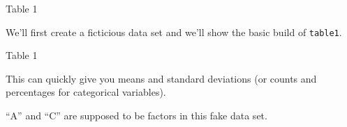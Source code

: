 \begin{frame}[fragile]{Table 1}

We'll first create a ficticious data set and we'll show the basic build
of \texttt{table1}.

\begin{Shaded}
\begin{Highlighting}[]
\StringTok{ }\NormalTok{(}\NormalTok{=}\NormalTok{(}\NormalTok{,}\NormalTok{,}\NormalTok{,}\NormalTok{,}\NormalTok{,}\NormalTok{),}
                 \NormalTok{=}\NormalTok{(}\NormalTok{,}\NormalTok{,}\NormalTok{,}\NormalTok{,}\NormalTok{,}\NormalTok{),}
                 \NormalTok{=}\NormalTok{(}\NormalTok{,}\NormalTok{,}\NormalTok{,}\NormalTok{,}\NormalTok{,}\NormalTok{),}
                 \NormalTok{=}\NormalTok{(}\NormalTok{))}
\end{Highlighting}
\end{Shaded}

\end{frame}

\begin{frame}[fragile]{Table 1}

This can quickly give you means and standard deviations (or counts and
percentages for categorical variables).

``A'' and ``C'' are supposed to be factors in this fake data set.

\begin{Shaded}
\begin{Highlighting}[]
\OperatorTok{$}\StringTok{ }\OperatorTok{$}\NormalTok{(}\NormalTok{, }\NormalTok{, }\NormalTok{, }\NormalTok{))}
\OperatorTok{$}\StringTok{ }\OperatorTok{$}\NormalTok{(}\NormalTok{, }\NormalTok{))}
\end{Highlighting}
\end{Shaded}

\end{frame}

